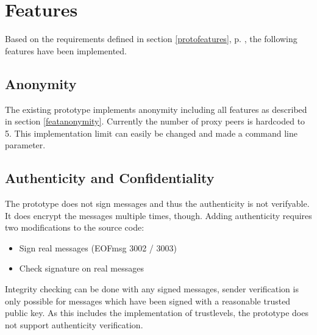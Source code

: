 \section{Features}
Based on the requirements defined in section \ref{protofeatures}, 
p. \pageref{protofeatures}, the following features have been implemented. 
\subsection{Anonymity}
The existing prototype implements anonymity including
all features as described in section \ref{featanonymity}.
Currently the number of proxy peers is hardcoded to 5. This implementation
limit can easily be changed and made a command line parameter.
\subsection{Authenticity and Confidentiality}
The prototype does not sign messages and thus the authenticity is not
verifyable. It does encrypt the messages multiple times, though.
Adding authenticity requires two modifications to the source code:
\begin{itemize}
\item Sign real messages (EOFmsg 3002 / 3003)
\item Check signature on real messages
\end{itemize}
Integrity checking can be done with any signed messages, sender verification
is only possible for messages which have been signed with a reasonable
trusted public key. As this includes the implementation of trustlevels, the
prototype does not support authenticity verification.
